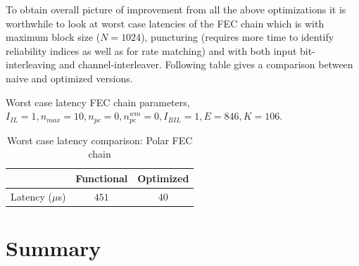 To obtain overall picture of improvement from all the above optimizations it is worthwhile to look at worst case latencies of the FEC chain which is with maximum block size ($N = 1024$), puncturing (requires more time to identify reliability indices as well as for rate matching) and with both input bit-interleaving and channel-interleaver. Following table gives a comparison between naive and optimized versions.

Worst case latency FEC chain parameters, \newline
$I_{IL} = 1, n_{max} = 10, n_{pc} = 0 ,n_{pc}^{wm} = 0, I_{BIL} = 1, E = 846, K = 106$.
\begin{table}[!h]
	\begin{center}
		\caption{Worst case latency comparison: Polar FEC chain}
		\label{tab:worstFecChain}
		\begin{tabular}{c|c|c} %
			\textbf{ } & Functional & Optimized \\
			\hline
			Latency ($\mu$s) & $451$ & $40$\\
		\end{tabular}
	\end{center}
\end{table}

\section{Summary}

